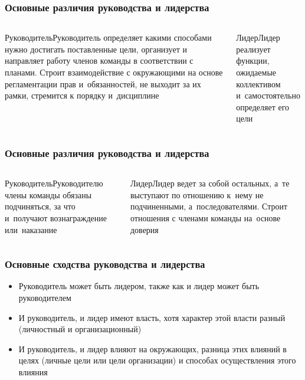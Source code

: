 \documentclass{../industrial-development}
\begin{document}
\begin{frame} \frametitle{Основные различия руководства и лидерства}

\begin{columns}
 			\begin{block}{Руководитель}Руководитель \alert{определяет} какими способами нужно \alert{достигать} поставленные \alert{цели}, \alert{организует} и направляет \alert{работу членов команды} в соответствии с планами. Строит взаимодействие с окружающими на основе регламентации прав и~обязанностей, не выходит за их рамки, \alert{стремится к порядку и~дисциплине}\end{block}
 		\column{4.9cm}
 			\begin{block}{Лидер}Лидер реализует функции, ожидаемые коллективом и~\alert{самостоятельно} определяет его цели \vspace{95pt} \end{block}
 	\end{columns}

\end{frame}



\begin{frame} \frametitle{Основные различия руководства и лидерства}

\begin{columns}
 			\begin{block}{Руководитель}Руководителю члены команды обязаны подчиняться, за что и~получают вознаграждение или~наказание
 			 \end{block}
 			\begin{block}{Лидер}Лидер ведет за собой остальных, а~те выступают по отношению к~нему не подчиненными, а~последователями. Строит отношения с членами команды на~основе доверия\end{block}
 	\end{columns}

\end{frame}



\begin{frame} \frametitle{Основные сходства руководства и лидерства}

\begin{itemize}
	\item \alert{Руководитель} может быть \alert{лидером}, также как и \alert{лидер} может быть \alert{руководителем}
	\item И руководитель, и лидер имеют власть, хотя характер этой власти разный (личностный и организационный)
	\item И руководитель, и лидер влияют на окружающих, разница этих влияний в целях (личные цели или цели организации) и способах осуществления этого влияния
	
\end{itemize}

\end{frame}
\end{document}
